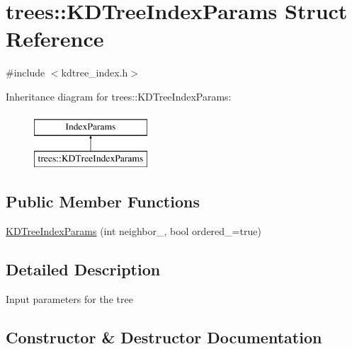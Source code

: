 \hypertarget{structtrees_1_1_k_d_tree_index_params}{}\section{trees\+:\+:K\+D\+Tree\+Index\+Params Struct Reference}
\label{structtrees_1_1_k_d_tree_index_params}


{\ttfamily \#include $<$kdtree\+\_\+index.\+h$>$}

Inheritance diagram for trees\+:\+:K\+D\+Tree\+Index\+Params\+:\begin{figure}[H]
\begin{center}
\leavevmode
\includegraphics[height=2.000000cm]{structtrees_1_1_k_d_tree_index_params}
\end{center}
\end{figure}
\subsection*{Public Member Functions}
\begin{DoxyCompactItemize}
\item 
\hyperlink{structtrees_1_1_k_d_tree_index_params_a4a1c6e02700c365e787d09fb4b821553}{K\+D\+Tree\+Index\+Params} (int neighbor\+\_, bool ordered\+\_\+=true)
\end{DoxyCompactItemize}


\subsection{Detailed Description}
Input parameters for the tree 

\subsection{Constructor \& Destructor Documentation}
\mbox{\label{structtrees_1_1_k_d_tree_index_params_a4a1c6e02700c365e787d09fb4b821553}} 

